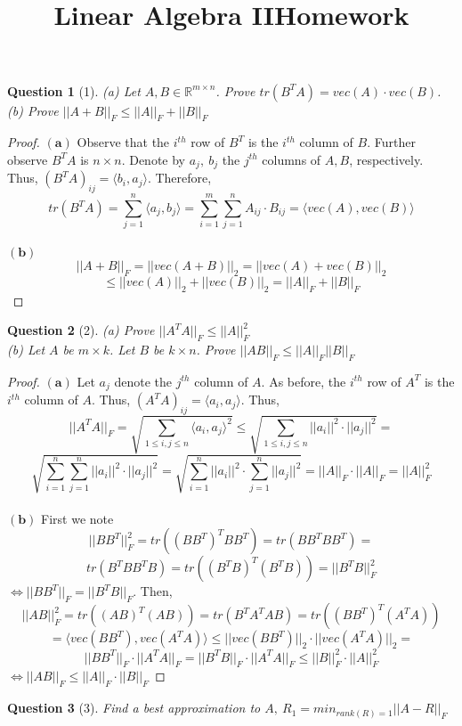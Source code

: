 \documentclass[11pt]{article}
\title{\vspace{-50pt}
\Huge \name
\\\vspace{20pt}
\huge Linear Algebra II\hfill Homework \hw}
\author{}
\date{}
\theoremstyle{quest}
\newtheorem*{question}{Question}
\begin{document}
\maketitle

\begin{question}[1]
(a) Let $A, B \in \mathbb{R}^{m \times n}$. Prove $tr(B^TA) = vec(A) \cdot vec(B)$.
\\(b) Prove $||A + B||_F \le ||A||_F + ||B||_F$
\end{question}
\begin{proof}
$\mathbf{(a)}$ Observe that the $i^{th}$ row of $B^T$ is the $i^{th}$ column of $B$. Further observe $B^TA$ is $n \times n$. Denote by $a_j,\ b_j$ the $j^{th}$ columns of $A, B$, respectively.
\\Thus, $(B^TA)_{i j} = \langle b_i, a_j \rangle$. Therefore,
$$tr(B^TA) = \sum_{j=1}^n \langle a_j, b_j \rangle = \sum_{i=1}^m \sum_{j=1}^n A_{i j} \cdot B_{i j} = \langle vec(A), vec(B)\rangle$$
\\$\mathbf{(b)}$
$$||A+B||_F = ||vec(A+B)||_2 = ||vec(A) + vec(B)||_2$$ $$\le ||vec(A)||_2 + ||vec(B)||_2 = ||A||_F + ||B||_F$$
\end{proof}
\begin{question}[2]
(a) Prove $||A^TA||_F \le ||A||_F^2$
\\(b) Let $A$ be $m \times k$. Let $B$ be $k \times n$. Prove $||AB||_F \le ||A||_F||B||_F$
\end{question}
\begin{proof}
$\mathbf{(a)}$ Let $a_j$ denote the $j^{th}$ column of $A$. As before, the $i^{th}$ row of $A^T$ is the $i^{th}$ column of $A$. Thus, $(A^TA)_{i j} = \langle a_i, a_j \rangle$. Thus,
$$||A^TA||_F = \sqrt{\sum_{1 \le i,j \le n} \langle a_i, a_j \rangle^2} \le \sqrt{\sum_{1 \le i,j \le n} ||a_i||^2 \cdot ||a_j||^2} = $$ $$\sqrt{\sum_{i=1}^n \sum_{j=1}^n ||a_i||^2 \cdot ||a_j||^2} = \sqrt{\sum_{i=1}^n ||a_i||^2 \cdot \sum_{j=1}^n  ||a_j||^2} = ||A||_F \cdot ||A||_F = ||A||_F^2$$
\\$\mathbf{(b)}$ First we note
$$||BB^T||_F^2 = tr((BB^T)^TBB^T) = tr(BB^TBB^T) =$$
$$tr(B^TBB^TB) = tr((B^TB)^T(B^TB)) = ||B^TB||_F^2$$
$\iff ||BB^T||_F = ||B^TB||_F$. Then,
$$||AB||_F^2 = tr((AB)^T(AB)) = tr(B^T A^T A B) = tr((BB^T)^T(A^TA))$$
$$= \langle vec(BB^T), vec(A^TA) \rangle \le ||vec(BB^T)||_2 \cdot ||vec(A^TA)||_2 = $$
$$||BB^T||_F \cdot ||A^TA||_F = ||B^TB||_F \cdot ||A^TA||_F \le ||B||_F^2 \cdot ||A||_F^2$$
$\iff ||AB||_F \le ||A||_F \cdot ||B||_F$
\end{proof}
\begin{question}[3]
Find a best approximation to $A,\ R_1 = min_{rank(R)=1} ||A-R||_F$
\end{question}
\end{document}
